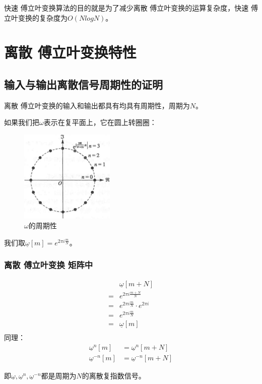 快速 傅立叶变换算法的目的就是为了减少离散 傅立叶变换的运算复杂度，快速 傅立叶变换的复杂度为$O(NlogN)$。
\section{离散 傅立叶变换特性}
\subsection{输入与输出离散信号周期性的证明}
离散 傅立叶变换的输入和输出都具有均具有周期性，周期为$N$。

如果我们把$\omega$表示在复平面上，它在圆上转圈圈：
\begin{figure}[H]
	\centering
	\includegraphics[width=0.4\textwidth]{assets/omega.png}
	\caption{$\omega$的周期性}
\end{figure}

我们取$\underline{\omega}[m] =e^{2\pi i \frac{m}{N}} $。
\subsubsection{离散 傅立叶变换 矩阵中}
\begin{align*}
	  & \underline{\omega}[m+N]               \\
	= & e^{2\pi i\frac{m+N}{N}}               \\
	= & e^{2\pi i\frac{m}{N}}\cdot e^{2\pi i} \\
	= & e^{2\pi i\frac{m}{N}}                 \\
	= & \underline{\omega}[m]                 \\
\end{align*}
同理：
\begin{align*}
	\underline{\omega}^{n}[m]  & = \underline{\omega}^n[m+N]    \\
	\underline{\omega}^{-n}[m] & = \underline{\omega}^{-n}[m+N]
\end{align*}

即$\underline{\omega},\underline{\omega}^n,\underline{\omega}^{-n}$都是周期为$N$的离散复指数信号。


